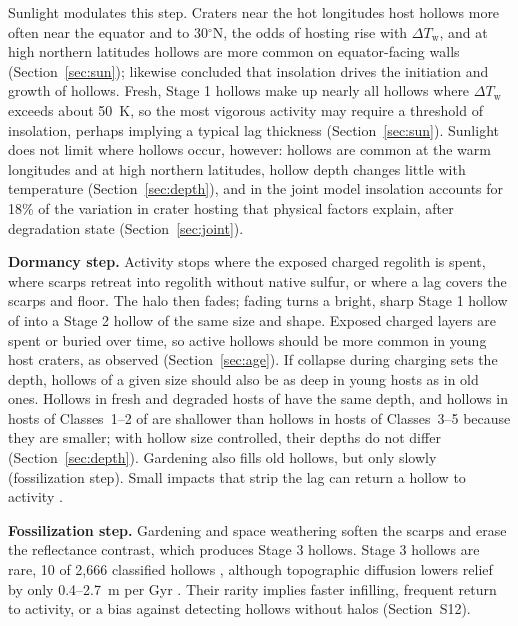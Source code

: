 \documentclass[article,review]{planetary}
\begin{document}
Sunlight modulates this step. Craters near the hot longitudes host hollows more often near the equator and to 30$^\circ$N, the odds of hosting rise with $\Delta T_\mathrm{w}$, and at high northern latitudes hollows are more common on equator-facing walls (Section~\ref{sec:sun}); \textcite{deutsch2025} likewise concluded that insolation drives the initiation and growth of hollows. Fresh, Stage 1 hollows make up nearly all hollows where $\Delta T_\mathrm{w}$ exceeds about 50~K, so the most vigorous activity may require a threshold of insolation, perhaps implying a typical lag thickness (Section~\ref{sec:sun}). Sunlight does not limit where hollows occur, however: hollows are common at the warm longitudes and at high northern latitudes, hollow depth changes little with temperature (Section~\ref{sec:depth}), and in the joint model insolation accounts for 18\% of the variation in crater hosting that physical factors explain, after degradation state (Section~\ref{sec:joint}).

\textbf{Dormancy step.} Activity stops where the exposed charged regolith is spent, where scarps retreat into regolith without native sulfur, or where a lag covers the scarps and floor. The halo then fades; fading turns a bright, sharp Stage 1 hollow of \textcite{deutsch2025} into a Stage 2 hollow of the same size and shape. Exposed charged layers are spent or buried over time, so active hollows should be more common in young host craters, as observed (Section~\ref{sec:age}). If collapse during charging sets the depth, hollows of a given size should also be as deep in young hosts as in old ones. Hollows in fresh and degraded hosts of \textcite{herrick2018} have the same depth, and hollows in hosts of Classes~1--2 of \textcite{kinczykMorphologicalEvaluationCrater2020} are shallower than hollows in hosts of Classes~3--5 because they are smaller; with hollow size controlled, their depths do not differ (Section~\ref{sec:depth}). Gardening also fills old hollows, but only slowly (fossilization step). Small impacts that strip the lag can return a hollow to activity \parencite{blewett2016}.

\textbf{Fossilization step.} Gardening and space weathering soften the scarps and erase the reflectance contrast, which produces Stage 3 hollows. Stage 3 hollows are rare, 10 of 2,666 classified hollows \parencite{deutsch2025}, although topographic diffusion lowers relief by only 0.4--2.7~m per Gyr \parencite{phillips2021}. Their rarity implies faster infilling, frequent return to activity, or a bias against detecting hollows without halos (Section~S12).
\end{document}

